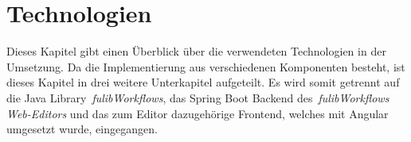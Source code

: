 \section{Technologien}\label{sec:technologien}
Dieses Kapitel gibt einen Überblick über die verwendeten Technologien in der Umsetzung.
Da die Implementierung aus verschiedenen Komponenten besteht, ist dieses Kapitel in drei weitere Unterkapitel aufgeteilt.
Es wird somit getrennt auf die Java Library~\textit{fulibWorkflows}, das Spring Boot Backend des~\textit{fulibWorkflows Web-Editors}
und das zum Editor dazugehörige Frontend, welches mit Angular umgesetzt wurde, eingegangen.








